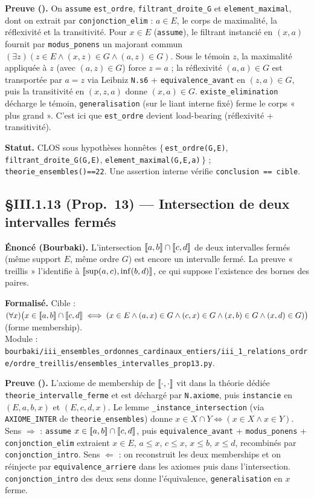 \textbf{Preuve (\Nstar).} On \texttt{assume} \texttt{est\_ordre}, \texttt{filtrant\_droite\_G} et \texttt{element\_maximal}, dont on extrait par \texttt{conjonction\_elim} : $a\in E$, le corps de maximalité, la réflexivité et la transitivité. Pour $x \in E$ (\texttt{assume}), le filtrant instancié en $(x,a)$ fournit par \texttt{modus\_ponens} un majorant commun $(\exists z)(z\in E \wedge (x,z)\in G \wedge (a,z)\in G)$. Sous le témoin $z$, la maximalité appliquée à $z$ (avec $(a,z)\in G$) force $z=a$ ; la réflexivité $(a,a)\in G$ est transportée par $a=z$ via Leibniz \texttt{N.s6} + \texttt{equivalence\_avant} en $(z,a)\in G$, puis la transitivité en $(x,z,a)$ donne $(x,a)\in G$. \texttt{existe\_elimination} décharge le témoin, \texttt{generalisation} (sur le liant interne fixé) ferme le corps « plus grand ». C'est ici que \texttt{est\_ordre} devient load-bearing (réflexivité + transitivité).

\textbf{Statut.} CLOS sous hypothèses honnêtes $\{\,$\texttt{est\_ordre(G,E)}, \texttt{filtrant\_droite\_G(G,E)}, \texttt{element\_maximal(G,E,a)}$\,\}$ ; \texttt{theorie\_ensembles()==22}. Une assertion interne vérifie \texttt{conclusion == cible}.

\subsection{§III.1.13 (Prop.~13) --- Intersection de deux intervalles fermés}
\textbf{Énoncé (Bourbaki).} L'intersection $\llbracket a, b \rrbracket \cap \llbracket c, d \rrbracket$ de deux intervalles fermés (même support $E$, même ordre $G$) est encore un intervalle fermé. La preuve « treillis » l'identifie à $\llbracket \sup(a,c), \inf(b,d) \rrbracket$, ce qui suppose l'existence des bornes des paires.

\textbf{Formalisé.} Cible : $(\forall x)\bigl(x \in \llbracket a, b \rrbracket\cap\llbracket c, d \rrbracket \iff (x\in E \wedge (a,x)\in G \wedge (c,x)\in G \wedge (x,b)\in G \wedge (x,d)\in G)\bigr)$ (forme membership). \\
Module : \texttt{bourbaki/iii\_ensembles\_ordonnes\_cardinaux\_entiers/iii\_1\_relations\_ordre/ordre\_treillis/ensembles\_intervalles\_prop13.py}.

\textbf{Preuve (\Nstar).} L'axiome de membership de $\llbracket \cdot, \cdot \rrbracket$ vit dans la théorie dédiée \texttt{theorie\_intervalle\_ferme} et est déchargé par \texttt{N.axiome}, puis \texttt{instancie} en $(E,a,b,x)$ et $(E,c,d,x)$. Le lemme \texttt{\_instance\_intersection} (via \texttt{AXIOME\_INTER} de \texttt{theorie\_ensembles}) donne $x\in X\cap Y \iff (x\in X \wedge x\in Y)$. Sens $\Rightarrow$ : \texttt{assume} $x\in\llbracket a, b \rrbracket\cap\llbracket c, d \rrbracket$, puis \texttt{equivalence\_avant} + \texttt{modus\_ponens} + \texttt{conjonction\_elim} extraient $x\in E$, $a\le x$, $c\le x$, $x\le b$, $x\le d$, recombinés par \texttt{conjonction\_intro}. Sens $\Leftarrow$ : on reconstruit les deux memberships et on réinjecte par \texttt{equivalence\_arriere} dans les axiomes puis dans l'intersection. \texttt{conjonction\_intro} des deux sens donne l'équivalence, \texttt{generalisation} en $x$ ferme.

